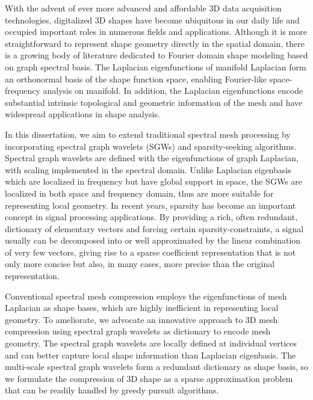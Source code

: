 \documentclass[12pt,letterpaper,twosided]{report}
\numberwithin{equation}{section}
\begin{document}
With the advent of ever more advanced and affordable 3D data acquisition
technologies, digitalized 3D shapes have become ubiquitous in our daily life
and occupied important roles in numerous fields and applications.
Although it is more straightforward to represent shape geometry directly
in the spatial domain, there is a growing body of literature dedicated to Fourier
domain shape modeling based on graph spectral basis. The Laplacian eigenfunctions of
manifold Laplacian form an orthonormal basis of the shape function space,
enabling Fourier-like space-frequency analysis on manifold. In addition,
the Laplacian eigenfunctions encode substantial intrinsic topological and geometric
information of the mesh and have widespread applications in shape analysis.

In this dissertation, we aim to extend traditional spectral mesh processing
by incorporating spectral graph wavelets (SGWs) and sparsity-seeking algorithms.
Spectral graph wavelets are defined with the eigenfunctions of graph
Laplacian, with scaling implemented in the spectral domain. Unlike
Laplacian eigenbasis which are localized in frequency but have global support
in space, the SGWs are localized in both space and frequency domain, thus
are more suitable for representing local geometry. In recent years, sparsity
has become an important concept in signal processing applications. By providing
a rich, often redundant, dictionary of elementary vectors and forcing certain
sparsity-constraints, a signal usually can be decomposed into or well approximated
by the linear combination of very few vectors, giving rise to a sparse coefficient
representation that is not only more concise but also, in many cases, more precise
than the original representation.

Conventional spectral mesh compression employs the eigenfunctions of
mesh Laplacian as shape bases, which are highly inefficient
in representing local geometry. To ameliorate, we advocate an
innovative approach to 3D mesh compression using spectral graph
wavelets as dictionary to encode mesh geometry. The spectral graph wavelets are locally
defined at individual vertices and can better capture local shape
information than Laplacian eigenbasis. The multi-scale
spectral graph wavelets form a redundant dictionary as shape basis,
so we formulate the compression of 3D shape as a sparse
approximation problem that can be readily handled by greedy pursuit algorithms.
\end{document}
